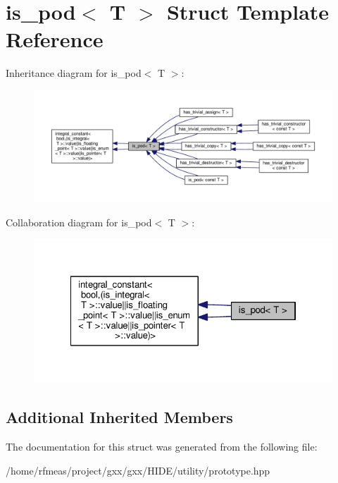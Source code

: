 \hypertarget{structis__pod}{}\section{is\+\_\+pod$<$ T $>$ Struct Template Reference}
\label{structis__pod}


Inheritance diagram for is\+\_\+pod$<$ T $>$\+:
\nopagebreak
\begin{figure}[H]
\begin{center}
\leavevmode
\includegraphics[width=350pt]{structis__pod__inherit__graph}
\end{center}
\end{figure}


Collaboration diagram for is\+\_\+pod$<$ T $>$\+:
\nopagebreak
\begin{figure}[H]
\begin{center}
\leavevmode
\includegraphics[width=322pt]{structis__pod__coll__graph}
\end{center}
\end{figure}
\subsection*{Additional Inherited Members}


The documentation for this struct was generated from the following file\+:\begin{DoxyCompactItemize}
\item 
/home/rfmeas/project/gxx/gxx/\+H\+I\+D\+E/utility/prototype.\+hpp\end{DoxyCompactItemize}
